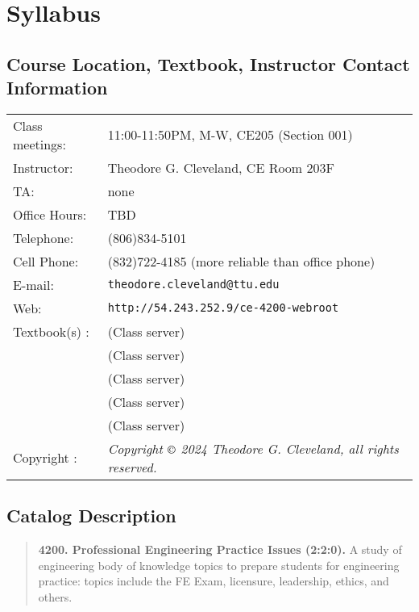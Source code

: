 \documentclass[12pt]{article}
\begin{document}
\section*{Syllabus}

\subsection*{{Course Location, Textbook, Instructor Contact Information}}
\begin{tabular}{p{1.5in}p{5.0in}}
Class meetings: &   11:00-11:50PM, M-W, CE205 (Section 001) \\
Instructor: & Theodore G. Cleveland, CE Room 203F \\
TA: & none \\
Office Hours: & TBD \\%
Telephone: & (806)834-5101 \\
Cell Phone: & (832)722-4185 (more reliable than office phone) \\
E-mail: & \texttt{theodore.cleveland@ttu.edu}\\
Web: & \texttt{http://54.243.252.9/ce-4200-webroot}\\
Textbook(s) : & \cite{ASCE2019} (Class server) \\
~ & \cite{NCEES2013} (Class server) \\
~ & \cite{Lindeburg2017} (Class server) \\
~ & \cite{NCEES2020} (Class server)\\
~ & \cite{Cleveland2024} (Class server)\\
Copyright : & \textsl{Copyright $\copyright$ 2024 Theodore G. Cleveland, all rights reserved.} \\
\end{tabular}
\subsection*{{Catalog Description}}
\begin{quote} \textbf{4200.  Professional Engineering Practice Issues (2:2:0).} A study of engineering
body of knowledge topics to prepare students for engineering practice: topics include the FE
Exam, licensure, leadership, ethics, and others.
\end{quote}
\end{document}
